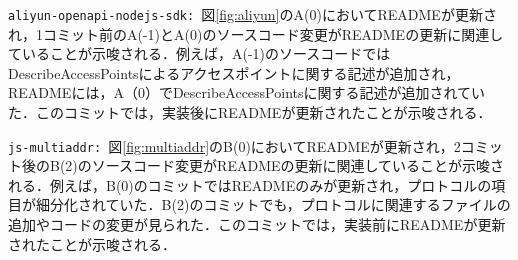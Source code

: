 \documentclass[uplatex,dvipdfmx,a4paper,twocolumn,base=11pt,jbase=11pt,ja=standard]{bxjsarticle}  %
\newcommand{\todo}[1]{\colorbox{yellow}{{\bf TODO}:}{\color{red} {\textbf{[#1]}}}}
\begin{document}
\noindent\texttt{aliyun-openapi-nodejs-sdk: }図\ref{fig:aliyun}のA(0)においてREADMEが更新され，1コミット前のA(-1)とA(0)のソースコード変更がREADMEの更新に関連していることが示唆される．例えば，A(-1)のソースコードではDescribeAccessPointsによるアクセスポイントに関する記述が追加され，READMEには，A（0）でDescribeAccessPointsに関する記述が追加されていた．このコミットでは，実装後にREADMEが更新されたことが示唆される．


%



\noindent\texttt{js-multiaddr: }図\ref{fig:multiaddr}のB(0)においてREADMEが更新され，2コミット後のB(2)のソースコード変更がREADMEの更新に関連していることが示唆される．例えば，B(0)のコミットではREADMEのみが更新され，プロトコルの項目が細分化されていた．B(2)のコミットでも，プロトコルに関連するファイルの追加やコードの変更が見られた．このコミットでは，実装前にREADMEが更新されたことが示唆される．


%
%
%
\end{document}
